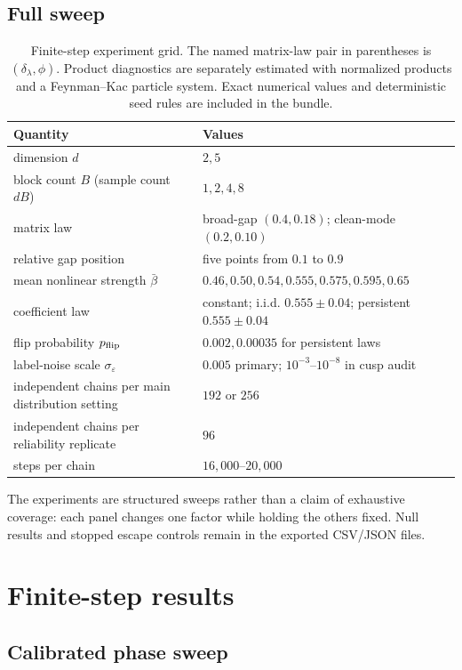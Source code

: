 \documentclass[11pt]{article}
\theoremstyle{definition}
\begin{document}
\subsection{Full sweep}

\begin{table}[H]
\centering
\small
\begin{tabular}{@{}ll@{}}
\toprule
Quantity & Values \\
\midrule
dimension $d$ & $2,5$ \\
block count $B$ (sample count $dB$) & $1,2,4,8$ \\
matrix law & broad-gap $(0.4,0.18)$; clean-mode $(0.2,0.10)$ \\
relative gap position & five points from $0.1$ to $0.9$ \\
mean nonlinear strength $\bar\beta$ & $0.46,0.50,0.54,0.555,0.575,0.595,0.65$ \\
coefficient law & constant; i.i.d. $0.555\pm0.04$; persistent $0.555\pm0.04$ \\
flip probability $p_{\rm flip}$ & $0.002,0.00035$ for persistent laws \\
label-noise scale $\sigma_\varepsilon$ & $0.005$ primary; $10^{-3}$--$10^{-8}$ in cusp audit \\
independent chains per main distribution setting & $192$ or $256$ \\
independent chains per reliability replicate & $96$ \\
steps per chain & $16{,}000$--$20{,}000$ \\
\bottomrule
\end{tabular}
\caption{Finite-step experiment grid.  The named matrix-law pair in
parentheses is $(\delta_\lambda,\phi)$.  Product diagnostics are separately
estimated with normalized products and a Feynman--Kac particle system.  Exact
numerical values and deterministic seed rules are included in the bundle.}
\label{tab:full-grid}
\end{table}

The experiments are structured sweeps rather than a claim of exhaustive
coverage: each panel changes one factor while holding the others fixed.  Null
results and stopped escape controls remain in the exported CSV/JSON files.

\section{Finite-step results}
\label{sec:results}

\subsection{Calibrated phase sweep}
\end{document}
